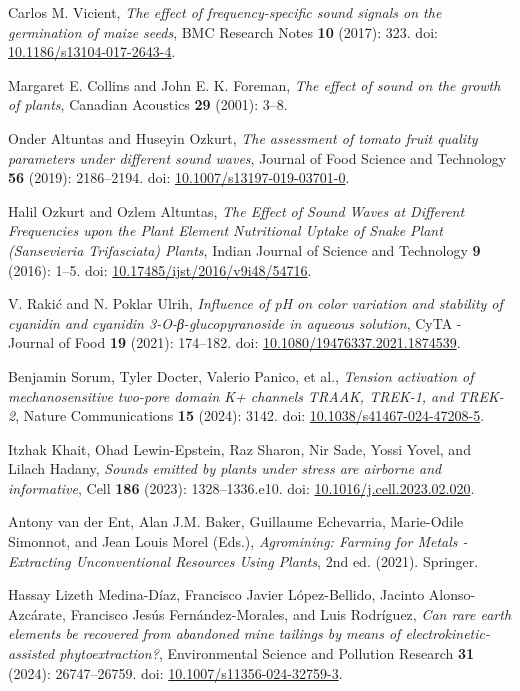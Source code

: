 \documentclass[twocolumn]{article}
\begin{document}
\begin{thebibliography}{99}

Carlos M. Vicient,
\textit{The effect of frequency-specific sound signals on the germination of maize seeds},
BMC Research Notes \textbf{10} (2017): 323. doi: \url{10.1186/s13104-017-2643-4}.

Margaret E. Collins and John E. K. Foreman,
\textit{The effect of sound on the growth of plants},
Canadian Acoustics \textbf{29} (2001): 3--8.

Onder Altuntas and Huseyin Ozkurt,
\textit{The assessment of tomato fruit quality parameters under different sound waves},
Journal of Food Science and Technology \textbf{56} (2019): 2186--2194. doi: \url{10.1007/s13197-019-03701-0}.

Halil Ozkurt and Ozlem Altuntas,
\textit{The Effect of Sound Waves at Different Frequencies upon the Plant Element Nutritional Uptake of Snake Plant (Sansevieria Trifasciata) Plants},
Indian Journal of Science and Technology \textbf{9} (2016): 1--5. doi: \url{10.17485/ijst/2016/v9i48/54716}.

V. Rakić and N. Poklar Ulrih,
\textit{Influence of pH on color variation and stability of cyanidin and cyanidin 3-O-β-glucopyranoside in aqueous solution},
CyTA - Journal of Food \textbf{19} (2021): 174--182. doi: \url{10.1080/19476337.2021.1874539}.

Benjamin Sorum, Tyler Docter, Valerio Panico, et al.,
\textit{Tension activation of mechanosensitive two-pore domain K+ channels TRAAK, TREK-1, and TREK-2},
Nature Communications \textbf{15} (2024): 3142. doi: \url{10.1038/s41467-024-47208-5}.

Itzhak Khait, Ohad Lewin-Epstein, Raz Sharon, Nir Sade, Yossi Yovel, and Lilach Hadany,
\textit{Sounds emitted by plants under stress are airborne and informative},
Cell \textbf{186} (2023): 1328--1336.e10. doi: \url{10.1016/j.cell.2023.02.020}.

Antony van der Ent, Alan J.M. Baker, Guillaume Echevarria, Marie-Odile Simonnot, and Jean Louis Morel (Eds.),
\textit{Agromining: Farming for Metals - Extracting Unconventional Resources Using Plants}, 2nd ed. (2021). Springer.

Hassay Lizeth Medina-Díaz, Francisco Javier López-Bellido, Jacinto Alonso-Azcárate, Francisco Jesús Fernández-Morales, and Luis Rodríguez,
\textit{Can rare earth elements be recovered from abandoned mine tailings by means of electrokinetic-assisted phytoextraction?},
Environmental Science and Pollution Research \textbf{31} (2024): 26747--26759. doi: \url{10.1007/s11356-024-32759-3}.


\end{thebibliography}
\end{document}

